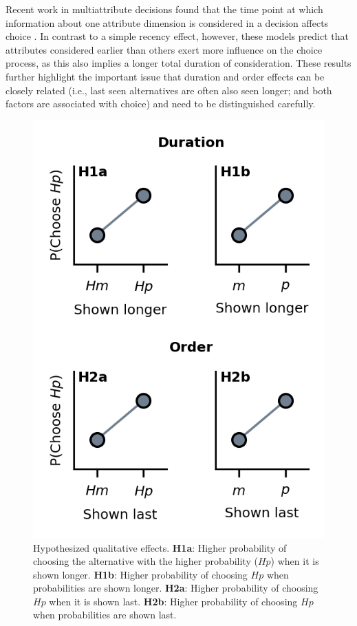 \documentclass[11pt, a4paper, twocolumn, abstract]{scrartcl}
\begin{document}
Recent work in multiattribute decisions found that the time point at which information about one attribute dimension is considered in a decision affects choice \parencite{maier2020DissociableMechanismsGovern,sullivan2021HealthfulChoicesDependa,amasino2019AmountTimeExert}. In contrast to a simple recency effect, however, these models predict that attributes considered earlier than others exert more influence on the choice process, as this also implies a longer total duration of consideration. These results further highlight the important issue that duration and order effects can be closely related (i.e., last seen alternatives are often also seen longer; and both factors are associated with choice) and need to be distinguished carefully.

\begin{figure}[tb]
    \centering
    \includegraphics[width=0.9\columnwidth]{figures/hypotheses.png}
    \caption{Hypothesized qualitative effects. \textbf{H1a}: Higher probability of choosing the alternative with the higher probability ($Hp$) when it is shown longer. \textbf{H1b}: Higher probability of choosing $Hp$ when probabilities are shown longer. \textbf{H2a}: Higher probability of choosing $Hp$ when it is shown last. \textbf{H2b}: Higher probability of choosing $Hp$ when probabilities are shown last. }
    \label{fig:hypotheses}
\end{figure}
\end{document}
